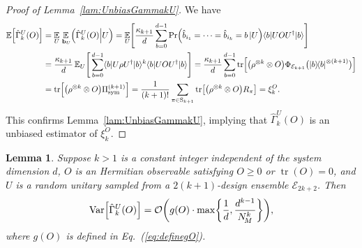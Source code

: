 \documentclass[aps,prl,twocolumn,nofootinbib,superscriptaddress,10pt]{revtex4-2}
\let\originalleft\left
\let\originalright\right
\renewcommand{\left}{\mathopen{}\mathclose\bgroup\originalleft}
\renewcommand{\right}{\aftergroup\egroup\originalright}
\def\E{ {\mathbb E} } %
\def\>{\rangle}
\def\<{\langle}
\newcommand{\ketbra}[2]{\ensuremath{\left|#1\right\rangle\!\left\langle#2\right|}}
\DeclareMathOperator{\Var}{Var}
\DeclareMathOperator{\Tr}{tr}
\newcommand{\bigo}[1]{\mathcal{O}\left(#1\right)}
\theoremstyle{plain}
\newtheorem{lemma}{Lemma}
\theoremstyle{definition}
\newcommand{\eref}[1]{Eq.~\textup{(\ref{#1})}}
\newcommand{\lref}[1]{Lemma~\ref{#1}}
\begin{document}
\begin{proof}[Proof of \lref{lam:UnbiasGammakU}]
We have
\begin{align}
\E \left[ \hat{\Gamma}_k^U (O)\right] 
&=\underset{U }{\E} \, \underset{\,\mathbf{b}_{U}}{\E} \left( \hat{\Gamma}_k^U (O) \Big| U \right)
 =\underset{U }{\E} \left[ \frac{\kappa_{k+1}}{d} \sum_{b=0}^{d-1} 
            \Pr\left(\hat{b}_{i_1}=\dots=\hat{b}_{i_k}=b \,|U \right) \<b|UO U^{\dag}|b\>\right] 
\nonumber \\
&=\frac{\kappa_{k+1}}{d}\, \E_{U} \left[\, \sum_{b=0}^{d-1} \<b|U\rho U^{\dag}|b\>^k \<b|UO U^{\dag}|b\> \right] 
= \frac{\kappa_{k+1}}{d} \sum_{b=0}^{d-1} \Tr \left[ \left( \rho^{\otimes k}\otimes O \right)  
\Phi_{\mathcal E_{k+1}} \big( \ketbra{b}{b}^{\otimes {(k+1)}} \big) \right]
\nonumber \\
&= \Tr\!\Big[ \left( \rho^{\otimes k}\otimes O \right)  \Pi_{\mathrm{sym}}^{(k+1)} \Big]
=\frac{1 }{(k+1)! } \sum_{\pi\in \mathrm{S}_{k+1}}  \Tr\left[ \left(\rho^{\otimes k} \otimes O \right)R_\pi\right]
=\xi_k^{O} . 
\end{align}
This confirms \lref{lam:UnbiasGammakU}, implying that $\hat{\Gamma}_k^U (O)$ is an unbiased estimator of $\xi_k^{O}$. 
\end{proof}



\begin{lemma}\label{lem:MomOVariance}
Suppose $k>1$ is a constant integer independent of the system dimension $d$, 
$O$ is an Hermitian observable satisfying $O\geq0$ or $\Tr(O)=0$,
and $U$ is a random unitary  sampled from a $2(k+1)$-design ensemble $\mathcal E_{2k+2}$. Then 
\begin{align}
\Var\left[\hat{\Gamma}_k^U (O)\right] 
= \bigo{g(O) \cdot \max\left\lbrace \frac{1}{d} ,\frac{d^{k-1}}{N_{\!M}^{k}}\right\rbrace},  
\end{align}
where $g(O)$ is defined in \eref{eq:definegO}. 
\end{lemma}
\end{document}
